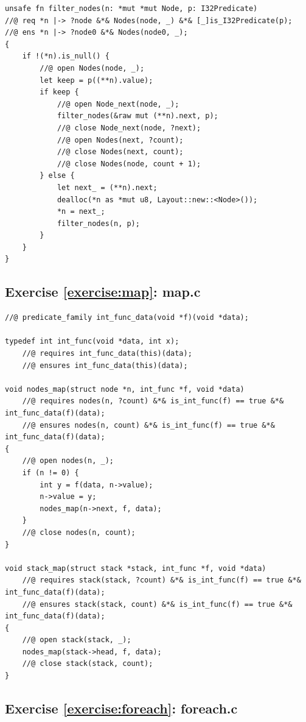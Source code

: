 \documentclass{article}
\begin{document}
\begin{lstlisting}
unsafe fn filter_nodes(n: *mut *mut Node, p: I32Predicate)
//@ req *n |-> ?node &*& Nodes(node, _) &*& [_]is_I32Predicate(p);
//@ ens *n |-> ?node0 &*& Nodes(node0, _);
{
    if !(*n).is_null() {
        //@ open Nodes(node, _);
        let keep = p((**n).value);
        if keep {
            //@ open Node_next(node, _);
            filter_nodes(&raw mut (**n).next, p);
            //@ close Node_next(node, ?next);
            //@ open Nodes(next, ?count);
            //@ close Nodes(next, count);
            //@ close Nodes(node, count + 1);
        } else {
            let next_ = (**n).next;
            dealloc(*n as *mut u8, Layout::new::<Node>());
            *n = next_;
            filter_nodes(n, p);
        }
    }
}
\end{lstlisting}

\subsection{Exercise \ref{exercise:map}:
map.c}\label{solution:map}

\begin{lstlisting}
//@ predicate_family int_func_data(void *f)(void *data);

typedef int int_func(void *data, int x);
    //@ requires int_func_data(this)(data);
    //@ ensures int_func_data(this)(data);

void nodes_map(struct node *n, int_func *f, void *data)
    //@ requires nodes(n, ?count) &*& is_int_func(f) == true &*& int_func_data(f)(data);
    //@ ensures nodes(n, count) &*& is_int_func(f) == true &*& int_func_data(f)(data);
{
    //@ open nodes(n, _);
    if (n != 0) {
        int y = f(data, n->value);
        n->value = y;
        nodes_map(n->next, f, data);
    }
    //@ close nodes(n, count);
}

void stack_map(struct stack *stack, int_func *f, void *data)
    //@ requires stack(stack, ?count) &*& is_int_func(f) == true &*& int_func_data(f)(data);
    //@ ensures stack(stack, count) &*& is_int_func(f) == true &*& int_func_data(f)(data);
{
    //@ open stack(stack, _);
    nodes_map(stack->head, f, data);
    //@ close stack(stack, count);
}
\end{lstlisting}

\subsection{Exercise \ref{exercise:foreach}:
foreach.c}\label{solution:foreach}
\end{document}
